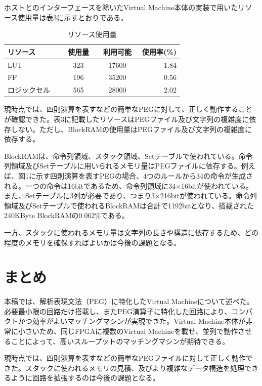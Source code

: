 \documentclass[submit]{ipsj}
\begin{document}
ホストとのインターフェースを除いたVirtual Machine本体の実装で用いたリソース使用量は表3に示すとおりである。

\begin{table}[h]
	\caption{リソース使用量}
	\centering
\begin{tabular}[t]{lccr}
	\hline\hline
	 リソース　& 使用量　&  利用可能　& 使用率(\%) \\\hline
	 LUT & 323 & 17600 & 1.84 \\
	 FF & 196 & 35200 & 0.56 \\
	 ロジックセル　& 565 & 28000 & 2.02 \\\hline
\end{tabular}
\end{table}
	 
現時点では、四則演算を表すなどの簡単なPEGに対して、正しく動作することが確認できた。表3に記載したリソースはPEGファイル及び文字列の複雑度に依存しない。ただし、BlockRAMの使用量はPEGファイル及び文字列の複雑度に依存する。

BlockRAMは、命令列領域、スタック領域、Setテーブルで使われている。命令列領域及びSetテーブルに用いられるメモリ量はPEGファイルに依存する。例えば、図1に示す四則演算を表すPEGの場合、4つのルールから34の命令が生成される。一つの命令は16bitであるため、命令列領域に34$\times$16bitが使われている。また、Setテーブルに3列が必要であり、つまり3$\times$216bitが使われている。命令列領域及びSetテーブルで使われるBlockRAMは合計で1192bitとなり、搭載された240KByte BlockRAMの0.062\%である。

一方、スタックに使われるメモリ量は文字列の長さや構造に依存するため、どの程度のメモリを確保すればよいかは今後の課題となる。






\section{まとめ}

本稿では、解析表現文法（PEG）に特化したVirtual Machineについて述べた。必要最小限の回路だけ搭載し、またPEG演算子に特化した回路により、コンパクトかつ効率がよいマッチングマシンが実現できた。Virtual Machine本体が非常に小さいため、同じFPGAに複数のVirtual Machineを載せ、並列で動作させることによって、高いスループットのマッチングマシンが期待できる。

現時点では、四則演算を表すなどの簡単なPEGファイルに対して正しく動作できた。スタックに使われるメモリの見積、及びより複雑なデータ構造を処理できるように回路を拡張するのは今後の課題となる。
\end{document}
